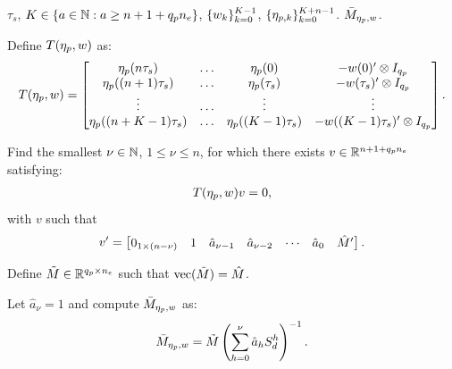 \begin{algorithm}[h!]
  \caption{Data-driven pseudo-steady-state output map estimation.}
  \label{alg:ddall_algo1}
  \begin{algorithmic}[1]
    \Require $\tau_s$, $K\in\{a\in\mathbb{N} : a \geq n + 1 + {q_p}{n_e}\}$, $\{w_k\}_{k=0}^{K-1}$, $\{\eta_{p,k}\}_{k=0}^{K+n-1}$.
    \Ensure $\bar{M}_{\eta_p,w}$.

    \State Define $T(\eta_p,w)$ as:
    \Statex
    \begin{align}
      \label{eq:ddall_Toeplitz}
      T(\eta_p,w) = \begin{bmatrix}
      \eta_p(n\tau_s)       & \ldots & \eta_p(0)           & -w(0)'\otimes I_{{q_p}} \\
      \eta_p((n+1)\tau_s)   & \ldots & \eta_p(\tau_s)      & -w(\tau_s)'\otimes I_{{q_p}} \\
      \vdots                 & \ldots & \vdots               & \vdots \\
      \eta_p((n+K-1)\tau_s) & \ldots & \eta_p((K-1)\tau_s) & -w((K-1)\tau_s)'\otimes I_{{q_p}}
      \end{bmatrix}.
    \end{align}

    \State Find the smallest $\nu\in\mathbb{N}$, $1\leq \nu\leq n$, for which there exists $v\in\mathbb{R}^{n+1+{q_p} n_e}$ satisfying:
    \Statex
    \begin{align}
      \label{eq:ddall_aM_hat}
      T(\eta_p,w)v=0,
    \end{align}
    \Statex with $v$ such that
    \Statex
    \begin{align}
      \label{eq:ddall_structure_v}
      v'=\begin{bmatrix}0_{1\times (n-\nu)} & 1 &\hat{a}_{\nu-1} & \hat{a}_{\nu-2} & \cdots & \hat{a}_{0} & \hat{M}'\end{bmatrix}.
    \end{align}

    \State Define $\tilde{M}\in\mathbb{R}^{{q_p}\times n_e}$ such that $\mathrm{vec}(\tilde{M})=\hat{M}$.

    \State Let $\hat{a}_\nu=1$ and compute $\bar{M}_{\eta_p,w}$ as:
    \Statex
    \begin{align}
      \label{eq:ddall_Minv}
      \bar{M}_{\eta_p,w}=\tilde{M}\left(\sum_{h=0}^{\nu}\hat{a}_h S_d^h \right)^{-1}.
    \end{align}
  \end{algorithmic}
\end{algorithm}

